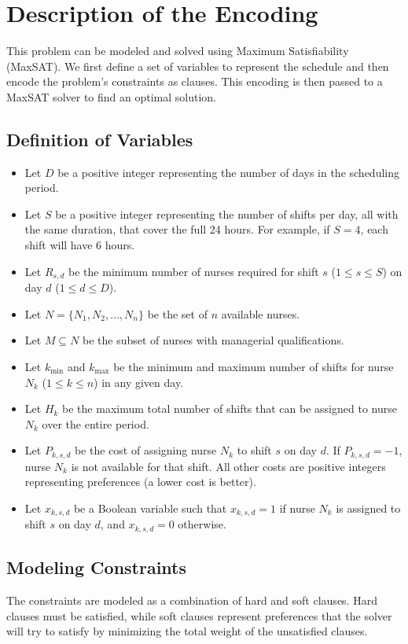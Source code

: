 \documentclass[sigconf, 11pt]{acmart}
\begin{document}
\section{Description of the Encoding}
This problem can be modeled and solved using Maximum Satisfiability (MaxSAT). We first define a set of variables to represent the schedule and then encode the problem's constraints as clauses. This encoding is then passed to a MaxSAT solver to find an optimal solution.

\subsection{Definition of Variables}
\begin{itemize}
    \item Let $D$ be a positive integer representing the number of days in the scheduling period.
    \item Let $S$ be a positive integer representing the number of shifts per day, all with the same duration, that cover the full 24 hours. For example, if $S = 4$, each shift will have 6 hours.
    \item Let $R_{s,d}$ be the minimum number of nurses required for shift $s$ ($1 \le s \le S$) on day $d$ ($1 \le d \le D$).
    \item Let $N = \{N_1, N_2, \dots, N_n\}$ be the set of $n$ available nurses.
    \item Let $M \subseteq N$ be the subset of nurses with managerial qualifications.
    \item Let $k_{\min}$ and $k_{\max}$ be the minimum and maximum number of shifts for nurse $N_k$ ($1 \le k \le n$) in any given day.
    \item Let $H_k$ be the maximum total number of shifts that can be assigned to nurse $N_k$ over the entire period.
    \item Let $P_{k,s,d}$ be the cost of assigning nurse $N_k$ to shift $s$ on day $d$. If $P_{k,s,d} = -1$, nurse $N_k$ is not available for that shift. All other costs are positive integers representing preferences (a lower cost is better).
    \item Let $x_{k,s,d}$ be a Boolean variable such that $x_{k,s,d} = 1$ if nurse $N_k$ is assigned to shift $s$ on day $d$, and $x_{k,s,d} = 0$ otherwise.
\end{itemize}

\subsection{Modeling Constraints}
The constraints are modeled as a combination of hard and soft clauses. Hard clauses must be satisfied, while soft clauses represent preferences that the solver will try to satisfy by minimizing the total weight of the unsatisfied clauses.
\end{document}
